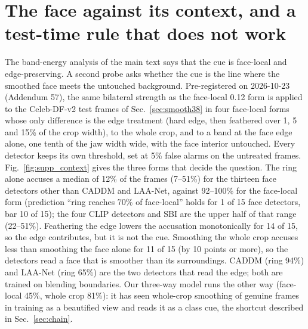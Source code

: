 \documentclass[10pt]{article}
\begin{document}
\section{The face against its context, and a test-time rule that does not work}
\label{sec:supp_context}
The band-energy analysis of the main text says that the cue is face-local and edge-preserving. A second probe asks whether the
cue is the line where the smoothed face meets the untouched background. Pre-registered on 2026-10-23 (Addendum 57), the same
bilateral strength as the face-local 0.12 form is applied to the Celeb-DF-v2 test frames of Sec.~\ref{sec:smooth38} in four
face-local forms whose only difference is the edge treatment (hard edge, then feathered over 1, 5 and 15\% of the crop width),
to the whole crop, and to a band at the face edge alone, one tenth of the jaw width wide, with the face interior untouched. Every detector keeps its own threshold, set at 5\% false alarms on the untreated frames.
Fig.~\ref{fig:supp_context} gives the three forms that decide the question. The ring alone accuses a median of 12\% of the frames
(7--51\%) for the thirteen face detectors other than CADDM and LAA-Net, against 92--100\% for the face-local form (prediction
``ring reaches 70\% of face-local'' holds for 1 of 15 face detectors, bar 10 of 15); the four CLIP detectors and SBI are the
upper half of that range (22--51\%). Feathering the edge lowers the accusation monotonically for 14 of
15, so the edge contributes, but it is not the cue. Smoothing the whole crop accuses less than smoothing the face alone for 11 of
15 (by 10 points or more), so the detectors read a face that is smoother than its surroundings. CADDM (ring 94\%) and LAA-Net
(ring 65\%) are the two detectors that read the edge; both are trained on blending boundaries. Our three-way model runs the
other way (face-local 45\%, whole crop 81\%): it has seen whole-crop smoothing of genuine frames in training as a beautified
view and reads it as a class cue, the shortcut described in Sec.~\ref{sec:chain}.
\end{document}
